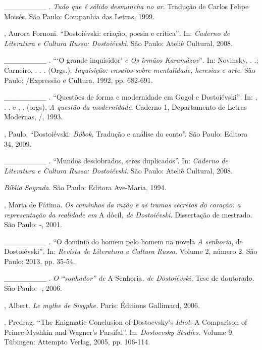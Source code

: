 \begin{Parskip}
\_\_\_\_\_\_\_\_ . \emph{Tudo que é sólido desmancha no ar.} Tradução de
Carlos Felipe Moisés. São Paulo: Companhia das Letras, 1999.

, Aurora Fornoni. ``Dostoiévski: criação, poesia e
crítica''\emph{.} In: \emph{Caderno de Literatura e Cultura Russa:
Dostoiévski}. São Paulo: Ateliê Cultural, 2008.

\_\_\_\_\_\_\_\_ . ```O grande inquisidor' \emph{e Os irmãos
Karamázov}''\emph{.} In: Novinsky, . .; Carneiro, . . . (Orgs.).
\emph{Inquisição: ensaios sobre mentalidade, heresias e arte.} São
Paulo: /Expressão e Cultura, 1992, pp. 682-691.

\_\_\_\_\_\_\_\_ . ``Questões de forma e modernidade em Gogol e
Dostoiévski''\emph{.} In: , . . e , . (orgs), \emph{A
questão da modernidade}. Caderno 1, Departamento de Letras Modernas,
/, 1993.

, Paulo. ``Dostoiévski: \emph{Bóbok}, Tradução e análise do
conto''. São Paulo: Editora 34, 2009.

\_\_\_\_\_\_\_\_ . ``Mundos desdobrados, seres duplicados''. In:
\emph{Caderno de Literatura e Cultura Russa: Dostoiévski}. São Paulo:
Ateliê Cultural, 2008.

\emph{Bíblia Sagrada}. São Paulo: Editora Ave-Maria, 1994.

, Maria de Fátima. \emph{Os caminhos da razão e as tramas
secretas do coração: a representação da realidade em} A dócil\emph{, de
Dostoiévski.} Dissertação de mestrado. São Paulo: -, 2001.

\_\_\_\_\_\_\_\_ . ``O domínio do homem pelo homem na novela \emph{A
senhoria}, de Dostoiévski''\emph{.} In: \emph{Revista de Literatura e
Cultura Russa.} Volume 2, número 2. São Paulo: 2013, pp. 35-54.

\_\_\_\_\_\_\_\_ . \emph{O ``sonhador'' de} A Senhoria\emph{, de
Dostoiévski.} Tese de doutorado. São Paulo: -, 2006.

, Albert. \emph{Le mythe de Sisyphe.} Paris: Éditions Gallimard,
2006.

, Predrag. ``The Enigmatic Conclusion of Dostoevsky's
\emph{Idiot}: A Comparison of Prince Myshkin and Wagner's Parsifal''.
In: \emph{Dostoevsky Studies.} Volume 9. Tübingen: Attempto Verlag,
2005, pp. 106-114.


\end{Parskip}

